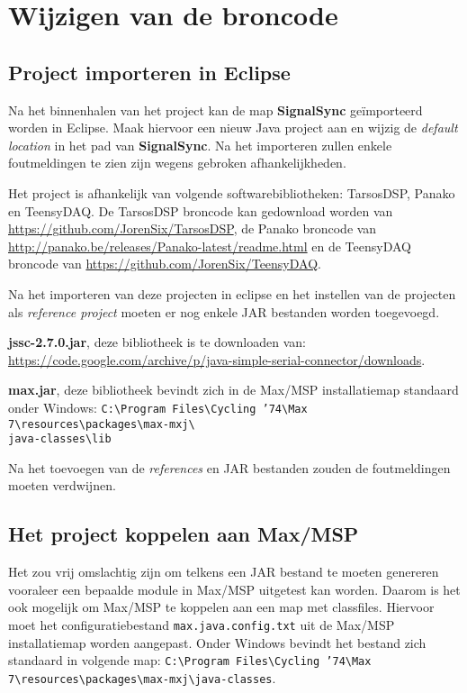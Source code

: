 \section*{Wijzigen van de broncode}

\subsection*{Project importeren in Eclipse}

Na het binnenhalen van het project kan de map \textbf{SignalSync} geïmporteerd worden in Eclipse. Maak hiervoor een nieuw Java project aan en wijzig de \textit{default location} in het pad van \textbf{SignalSync}. Na het importeren zullen enkele foutmeldingen te zien zijn wegens gebroken afhankelijkheden. 

Het project is afhankelijk van volgende softwarebibliotheken: TarsosDSP, Panako en TeensyDAQ. De TarsosDSP broncode kan gedownload worden van \url{https://github.com/JorenSix/TarsosDSP}, de Panako broncode van \url{http://panako.be/releases/Panako-latest/readme.html} en de TeensyDAQ broncode van \url{https://github.com/JorenSix/TeensyDAQ}. 

Na het importeren van deze projecten in eclipse en het instellen van de projecten als \textit{reference project} moeten er nog enkele JAR bestanden worden toegevoegd. 

\textbf{jssc-2.7.0.jar}, deze bibliotheek is te downloaden van: \url{https://code.google.com/archive/p/java-simple-serial-connector/downloads}.

\textbf{max.jar}, deze bibliotheek bevindt zich in de Max/MSP installatiemap standaard onder Windows: \texttt{C:\textbackslash Program Files\textbackslash Cycling '74\textbackslash Max 7\textbackslash resources\textbackslash packages\textbackslash max-mxj\textbackslash \\ java-classes\textbackslash lib}

Na het toevoegen van de \textit{references} en JAR bestanden zouden de foutmeldingen moeten verdwijnen.

\subsection*{Het project koppelen aan Max/MSP}

Het zou vrij omslachtig zijn om telkens een JAR bestand te moeten genereren vooraleer een bepaalde module in Max/MSP uitgetest kan worden. Daarom is het ook mogelijk om Max/MSP te koppelen aan een map met classfiles. Hiervoor moet het configuratiebestand \texttt{max.java.config.txt} uit de Max/MSP installatiemap worden aangepast. Onder Windows bevindt het bestand zich standaard in volgende map: \texttt{C:\textbackslash Program Files\textbackslash Cycling '74\textbackslash Max 7\textbackslash resources\textbackslash packages\textbackslash max-mxj\textbackslash java-classes}.

